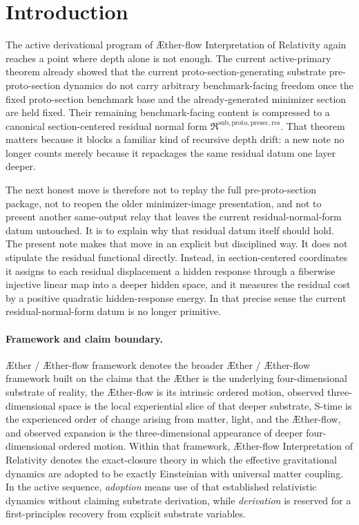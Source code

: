 \documentclass[11pt]{article}
\newcommand{\Aether}{\AE{}ther}
\newcommand{\Aflow}{\AE{}ther-flow}
\newcommand{\TheoryName}{\Aflow{} Interpretation of Relativity}
\newcommand{\TheoryProgram}{\Aether{} / \Aflow{} framework}
\newcommand{\PreProtoSectionResidualPackage}{\mathfrak R^{\mathrm{sub,proto,presec,res}}}
\begin{document}
\section{Introduction}

The active derivational program of \TheoryName{} again reaches a point where depth alone is not enough. The current active-primary theorem already showed that the current proto-section-generating substrate pre-proto-section dynamics do not carry arbitrary benchmark-facing freedom once the fixed proto-section benchmark base and the already-generated minimizer section are held fixed. Their remaining benchmark-facing content is compressed to a canonical section-centered residual normal form \(\PreProtoSectionResidualPackage\). That theorem matters because it blocks a familiar kind of recursive depth drift: a new note no longer counts merely because it repackages the same residual datum one layer deeper.

The next honest move is therefore not to replay the full pre-proto-section package, not to reopen the older minimizer-image presentation, and not to present another same-output relay that leaves the current residual-normal-form datum untouched. It is to explain why that residual datum itself should hold. The present note makes that move in an explicit but disciplined way. It does not stipulate the residual functional directly. Instead, in section-centered coordinates it assigns to each residual displacement a hidden response through a fiberwise injective linear map into a deeper hidden space, and it measures the residual cost by a positive quadratic hidden-response energy. In that precise sense the current residual-normal-form datum is no longer primitive.

\paragraph{Framework and claim boundary.}
\TheoryProgram{} denotes the broader \Aether{} / \Aflow{} framework built on the claims that the \Aether{} is the underlying four-dimensional substrate of reality, the \Aflow{} is its intrinsic ordered motion, observed three-dimensional space is the local experiential slice of that deeper substrate, S-time is the experienced order of change arising from matter, light, and the \Aflow{}, and observed expansion is the three-dimensional appearance of deeper four-dimensional ordered motion. Within that framework, \TheoryName{} denotes the exact-closure theory in which the effective gravitational dynamics are adopted to be exactly Einsteinian with universal matter coupling. In the active sequence, \emph{adoption} means use of that established relativistic dynamics without claiming substrate derivation, while \emph{derivation} is reserved for a first-principles recovery from explicit substrate variables.
\end{document}
